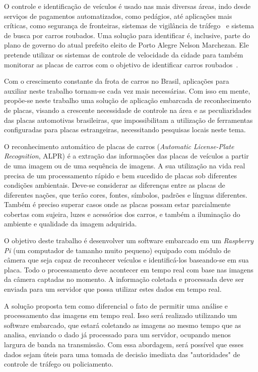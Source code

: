 O controle e identificação de veículos é usado nas mais diversas áreas, indo
desde serviços de pagamentos automatizados, como pedágios, até aplicações mais
críticas, como segurança de fronteiras, sistemas de vigilância de
tráfego~\cite{ahmad2015automatic} e sistema de busca por carros roubados.
Uma solução para identificar é, inclusive,  parte do plano de governo do atual prefeito eleito de Porto Alegre
Nelson Marchezan. Ele pretende utilizar os sistemas de controle de velocidade da cidade para também
monitorar as placas de carros com o objetivo de identificar carros roubados~\cite{psdb2016marchezan}.

Com o crescimento constante da frota de carros no Brasil, aplicações para
auxiliar neste trabalho tornam-se cada vez
mais necessárias. Com isso em mente, propõe-se neste trabalho uma solução de
aplicação embarcada de reconhecimento de placas, visando a
crescente necessidade de controle na área e as peculiaridades das placas
automotivas brasileiras, que impossibilitam a utilização de ferramentas
configuradas para placas estrangeiras, necessitando pesquisas locais neste
tema.

O reconhecimento automático de placas de carros (\emph{Automatic License-Plate
Recognition}, ALPR) é a extração das informações das placas de veículos a partir
de uma imagem ou de uma sequência de imagens. A sua utilização na vida real
precisa de um processamento rápido e bem sucedido de placas sob diferentes
condições ambientais. Deve-se considerar as diferenças entre as placas de
diferentes nações, que terão cores, fontes, símbolos, padrões e línguas
diferentes. Também é preciso superar casos onde as placas possam estar
parcialmente cobertas com sujeira, luzes e acessórios dos
carros, e também a iluminação do ambiente e qualidade
da imagem adquirida.~\cite{s2013automatic}

O objetivo deste trabalho é desenvolver um software embarcado em um \emph{Raspberry Pi}
(um computador de tamanho muito pequeno) equipado com módulo de câmera que seja
capaz de reconhecer veículos e identificá-los baseando-se em sua
placa. Todo o processamento deve acontecer em tempo real com base nas imagens da
câmera captadas no momento. A informação coletada e processada deve ser enviada
para um servidor que possa utilizar estes dados em tempo real.

A solução proposta tem como diferencial o fato de permitir uma
análise e processamento das imagens em tempo real. Isso será realizado
utilizando um software embarcado, que estará coletando as imagens ao mesmo tempo
que as analisa, enviando o dado já processado para um servidor, ocupando menos
largura de banda na transmissão. Com essa abordagem, será possível que esses
dados sejam úteis para uma tomada de decisão imediata das "autoridades" de
controle de tráfego ou policiamento.

